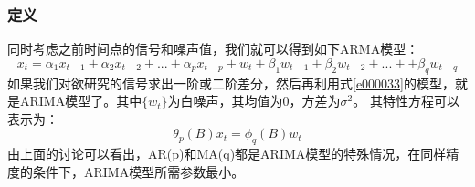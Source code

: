 \documentclass{article}
\begin{document}
\subsubsection{定义}
同时考虑之前时间点的信号和噪声值，我们就可以得到如下ARMA模型：
\begin{equation}
x_{t}=\alpha _{1}x_{t-1} + \alpha _{2}x_{t-2} + ... + \alpha _{p}x_{t-p} + w_{t} + \beta _1w_{t-1} + \beta _2w_{t-2}+...+ + \beta _{q}w_{t-q}
\label{e000033}
\end{equation}
如果我们对欲研究的信号求出一阶或二阶差分，然后再利用式\ref{e000033}的模型，就是ARIMA模型了。其中$\{ w_{t} \}$为白噪声，其均值为0，方差为$\sigma ^{2}$。\newline
其特性方程可以表示为：
\begin{equation}
\theta _{p}(B)x_{t}=\phi _{q}(B)w_{t}
\label{e000034}
\end{equation}
由上面的讨论可以看出，AR(p)和MA(q)都是ARIMA模型的特殊情况，在同样精度的条件下，ARIMA模型所需参数最小。
\end{document}
